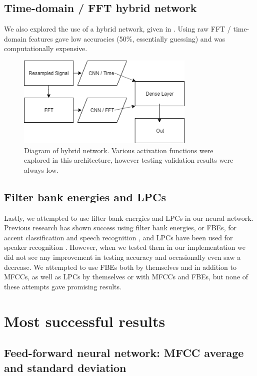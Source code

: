 \documentclass{article}
\begin{document}
\subsection{Time-domain / FFT hybrid network}
\label{subsec:fft}

We also explored the use of a hybrid network, given in .
Using raw FFT / time-domain features gave low accuracies (50\%, essentially guessing) and was computationally expensive.

\begin{figure}[htb]
	\centering
	\includegraphics[width = 8.5cm]{figs/hybrid_network}
	\caption{Diagram of hybrid network.
	Various activation functions were explored in this architecture, however testing validation results were always low.}
	\label{fig:hybrid}
\end{figure}

\subsection{Filter bank energies and LPCs}
\label{subsec:fbe}

Lastly, we attempted to use filter bank energies and LPCs in our neural network.
Previous research has shown success using filter bank energies, or FBEs, for accent classification and speech recognition \cite{Paliwal, chuaccent}, and LPCs have been used for speaker recognition \cite{lpc}.
However, when we tested them in our implementation we did not see any improvement in testing accuracy and occasionally even saw a decrease.
We attempted to use FBEs both by themselves and in addition to MFCCs, as well as LPCs by themselves or with MFCCs and FBEs, but none of these attempts gave promising results.

\section{Most successful results}
\label{sec:success}

\subsection{Feed-forward neural network: MFCC average and standard deviation}
\label{subsec:feedforward}
\end{document}
